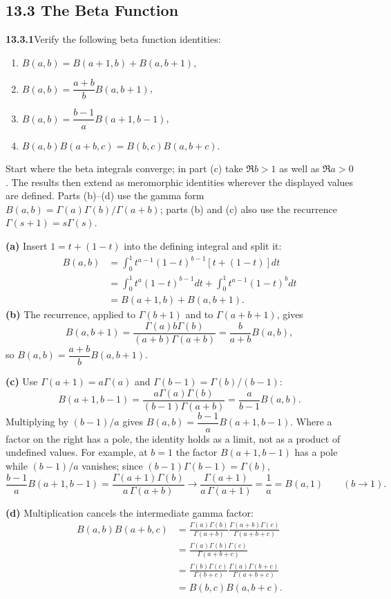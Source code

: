 \subsection*{13.3 The Beta Function}

\par\bigskip
\noindent\textbf{13.3.1}\quad Verify the following beta function identities:
\begin{enumerate}
\item[(a)] $B(a,b)=B(a+1,b)+B(a,b+1)$,
\item[(b)] $B(a,b)=\dfrac{a+b}{b}B(a,b+1)$,
\item[(c)] $B(a,b)=\dfrac{b-1}{a}B(a+1,b-1)$,
\item[(d)] $B(a,b)B(a+b,c)=B(b,c)B(a,b+c)$.
\end{enumerate}
\solution
Start where the beta integrals converge; in part (c) take
$\Re b>1$ as well as $\Re a>0$.  The results then extend as
meromorphic identities wherever the displayed values are defined.
Parts (b)--(d) use the gamma form
$B(a,b)=\Gamma(a)\Gamma(b)/\Gamma(a+b)$; parts (b) and (c) also
use the recurrence $\Gamma(s+1)=s\Gamma(s)$.

\textbf{(a)} Insert $1=t+(1-t)$ into the defining integral and
split it:
\begin{align*}
B(a,b)&=\int_0^1 t^{a-1}(1-t)^{b-1}[t+(1-t)]dt\\
&=\int_0^1 t^{a}(1-t)^{b-1}dt+\int_0^1 t^{a-1}(1-t)^{b}dt\\
&=\boxed{B(a+1,b)+B(a,b+1)}.
\end{align*}
\textbf{(b)} The recurrence, applied to $\Gamma(b+1)$ and to
$\Gamma(a+b+1)$, gives
\[
B(a,b+1)=\frac{\Gamma(a)b\Gamma(b)}{(a+b)\Gamma(a+b)}
=\frac b{a+b}B(a,b),
\]
so $\boxed{B(a,b)=\dfrac{a+b}{b}B(a,b+1)}$.

\textbf{(c)} Use $\Gamma(a+1)=a\Gamma(a)$ and
$\Gamma(b-1)=\Gamma(b)/(b-1)$:
\[
B(a+1,b-1)=\frac{a\Gamma(a)\Gamma(b)}{(b-1)\Gamma(a+b)}
=\frac a{b-1}B(a,b).
\]
Multiplying by $(b-1)/a$ gives
$\boxed{B(a,b)=\dfrac{b-1}{a}B(a+1,b-1)}$.  Where a factor on the
right has a pole, the identity holds as a limit, not as a product
of undefined values.  For example, at $b=1$ the factor
$B(a+1,b-1)$ has a pole while $(b-1)/a$ vanishes; since
$(b-1)\Gamma(b-1)=\Gamma(b)$,
\[
\frac{b-1}{a}B(a+1,b-1)=\frac{\Gamma(a+1)\Gamma(b)}{a\,\Gamma(a+b)}
\longrightarrow\frac{\Gamma(a+1)}{a\,\Gamma(a+1)}=\frac1a=B(a,1)
\qquad(b\to1).
\]

\textbf{(d)} Multiplication cancels the intermediate gamma factor:
\begin{align*}
B(a,b)B(a+b,c)
&=\frac{\Gamma(a)\Gamma(b)}{\Gamma(a+b)}
  \frac{\Gamma(a+b)\Gamma(c)}{\Gamma(a+b+c)}\\
&=\frac{\Gamma(a)\Gamma(b)\Gamma(c)}{\Gamma(a+b+c)}\\
&=\frac{\Gamma(b)\Gamma(c)}{\Gamma(b+c)}
  \frac{\Gamma(a)\Gamma(b+c)}{\Gamma(a+b+c)}\\
&=\boxed{B(b,c)B(a,b+c)}.
\end{align*}



